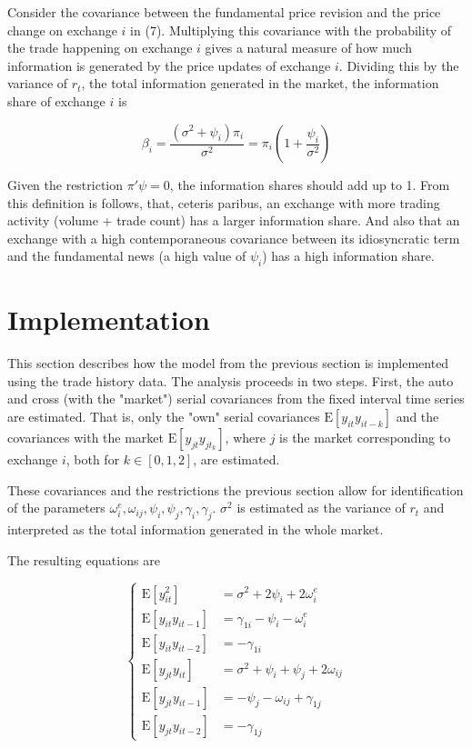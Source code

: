 \documentclass[a4paper,12pt]{article}
\newcommand{\E}{\mathrm{E}}
\begin{document}
    Consider the covariance between the fundamental price revision and the price change on exchange $i$ in (7). Multiplying this covariance with the probability of the trade happening on exchange $i$ gives a natural measure of how much information is generated by the price updates of exchange $i$. Dividing this by the variance of $r_t$, the total information generated in the market, the information share of exchange $i$ is

    \begin{equation}
      \beta_i = \frac{(\sigma^2 +\psi_i)\pi_i}{\sigma^2} = \pi_i\left(1 + \frac{\psi_i}{\sigma^2}\right)
    \end{equation}

    Given the restriction $\pi'\psi = 0$, the information shares should add up to 1. From this definition is follows, that, ceteris paribus, an exchange with more trading activity (volume + trade count) has a larger information share. And also that an exchange with a high contemporaneous covariance between its idiosyncratic term and the fundamental news (a high value of $\psi_i$) has a high information share.

    \section{Implementation}
      This section describes how the model from the previous section is implemented using the trade history data. The analysis proceeds in two steps. First, the auto and cross (with the "market") serial covariances from the fixed interval time series are estimated. That is, only the "own" serial covariances $\E[y_{it}y_{it-k}]$ and the covariances with the market $\E[y_{jt}y_{jt_k}]$, where $j$ is the market corresponding to exchange $i$, both for $k \in [0, 1, 2]$, are estimated.

      These covariances and the restrictions the previous section allow for identification of the parameters $\omega^e_{i}, \omega_{ij}, \psi_{i}, \psi_{j}, \gamma_{i}, \gamma_{j}$. $\sigma^2$ is estimated as the variance of $r_t$ and interpreted as the total information generated in the whole market.

      The resulting equations are

      \begin{equation}
        \begin{cases}
          \E[y^2_{it}] & = \sigma^2 + 2\psi_i + 2\omega^e_i \\
          \E[y_{it}y_{it-1}] & = \gamma_{1i} - \psi_i - \omega^e_i \\
          \E[y_{it}y_{it-2}] & = - \gamma_{1i} \\
          \E[y_{jt}y_{it}] & = \sigma^2 + \psi_i + \psi_j + 2\omega_{ij} \\
          \E[y_{jt}y_{it-1}] & = - \psi_j - \omega_{ij} + \gamma_{1j} \\
          \E[y_{jt}y_{it-2}] & = - \gamma_{1j}
        \end{cases}
      \end{equation}
\end{document}
